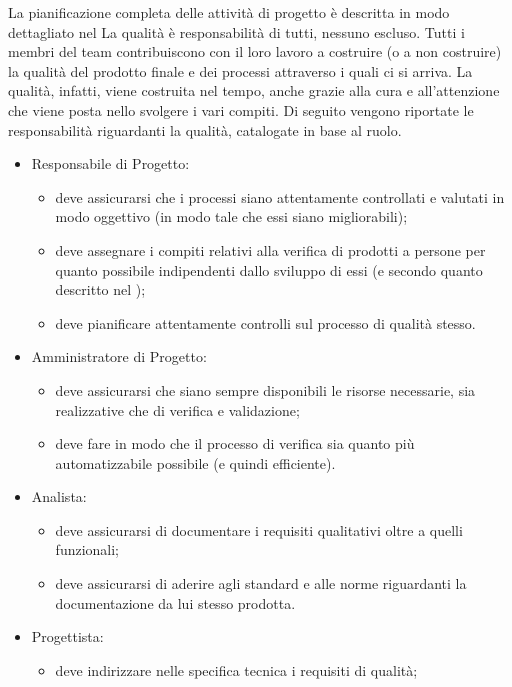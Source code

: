 			La pianificazione completa delle attività di progetto è descritta in modo dettagliato nel 
		 \label{subsec:responsabilita}
			La qualità è responsabilità di tutti, nessuno escluso. Tutti i membri del team contribuiscono con il loro lavoro a costruire (o a non 
			costruire) la qualità del prodotto finale e dei processi attraverso i quali ci si arriva. La qualità, infatti, viene costruita nel tempo, 
			anche grazie alla cura e all'attenzione che viene posta nello svolgere i vari compiti.
			Di seguito vengono riportate le responsabilità riguardanti la qualità, catalogate in base al ruolo.
			\begin{itemize}
				\item Responsabile di Progetto:
				\begin{itemize}
					\item deve assicurarsi che i processi siano attentamente controllati e valutati in modo oggettivo (in modo tale che essi siano 
					migliorabili);
					\item deve assegnare i compiti relativi alla verifica di prodotti a persone per quanto possibile indipendenti dallo sviluppo di essi 
					(e secondo quanto descritto nel );
					\item deve pianificare attentamente controlli sul processo di qualità stesso.
				\end{itemize}
				\item Amministratore di Progetto:
				\begin{itemize}
					\item deve assicurarsi che siano sempre disponibili le risorse necessarie, sia realizzative che di verifica e validazione;
					\item deve fare in modo che il processo di verifica sia quanto più automatizzabile possibile (e quindi efficiente).
				\end{itemize}
				\item Analista:
				\begin{itemize}
					\item deve assicurarsi di documentare i requisiti qualitativi oltre a quelli funzionali;
					\item deve assicurarsi di aderire agli standard e alle norme riguardanti la documentazione da lui stesso prodotta.
				\end{itemize}
				\item Progettista:
				\begin{itemize}
					\item deve indirizzare nelle specifica tecnica i requisiti di qualità;

\end{itemize}
\end{itemize}
